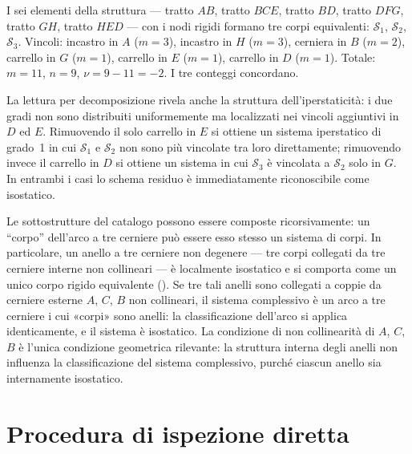 \begin{esempio}
	I sei elementi della struttura --- tratto $AB$,
	tratto $BCE$, tratto $BD$, tratto $DFG$, tratto
	$GH$, tratto $HED$ --- con i nodi rigidi formano
	tre corpi equivalenti: $\mathcal{S}_1$,
	$\mathcal{S}_2$, $\mathcal{S}_3$. Vincoli: incastro
	in $A$ ($m=3$), incastro in $H$ ($m=3$), cerniera
	in $B$ ($m=2$), carrello in $G$ ($m=1$), carrello
	in $E$ ($m=1$), carrello in $D$ ($m=1$). Totale:
	$m = 11$, $n = 9$, $\nu = 9 - 11 = -2$.
	I tre conteggi concordano.
	
	\begin{oss}
		La lettura per decomposizione rivela anche la
		struttura dell'iperstaticità: i due gradi non
		sono distribuiti uniformemente ma localizzati
		nei vincoli aggiuntivi in $D$ ed $E$. Rimuovendo
		il solo carrello in $E$ si ottiene un sistema
		iperstatico di grado~1 in cui $\mathcal{S}_1$
		e $\mathcal{S}_2$ non sono più vincolate tra
		loro direttamente; rimuovendo invece il carrello
		in $D$ si ottiene un sistema in cui $\mathcal{S}_3$
		è vincolata a $\mathcal{S}_2$ solo in $G$.
		In entrambi i casi lo schema residuo è
		immediatamente riconoscibile come isostatico.
	\end{oss}
\end{esempio}

\begin{oss}
	Le sottostrutture del catalogo possono essere
	composte ricorsivamente: un ``corpo'' dell'arco a
	tre cerniere può essere esso stesso un sistema
	di corpi. In particolare, un anello a tre cerniere
	non degenere --- tre corpi collegati da tre cerniere
	interne non collineari --- è localmente isostatico
	e si comporta come un unico corpo rigido equivalente
	(). Se tre tali anelli
	sono collegati a coppie da cerniere esterne $A$,
	$C$, $B$ non collineari, il sistema complessivo è
	un arco a tre cerniere i cui «corpi» sono anelli:
	la classificazione dell'arco si applica
	identicamente, e il sistema è isostatico.
	La condizione di non collinearità di $A$, $C$, $B$
	è l'unica condizione geometrica rilevante: la
	struttura interna degli anelli non influenza
	la classificazione del sistema complessivo,
	purché ciascun anello sia internamente isostatico.
\end{oss}


\section{Procedura di ispezione diretta}
\label{sec:ispezione}

